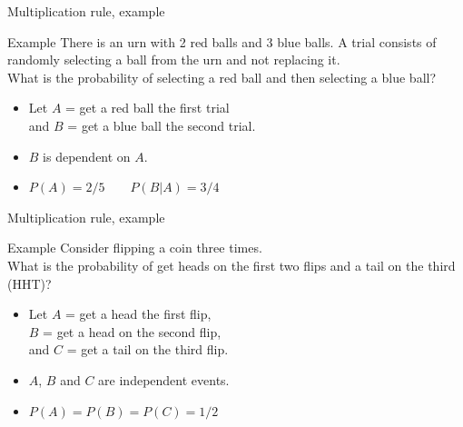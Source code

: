 \documentclass[xcolor=table, aspectratio=169, bigger]{beamer}
\begin{document}
\begin{frame}{Multiplication rule, example}
\begin{exampleblock}{Example}
There is an urn with 2 red balls and 3 blue balls. A trial consists of randomly selecting a ball from the urn and not replacing it.\\
\medskip 
What is the probability of selecting a red ball and then selecting a blue ball?
\begin{itemize}
\pause
\item Let $A$ = get a red ball the first trial\\
 and $B$ = get a blue ball the second trial.\\

\pause
\item $B$ is dependent on $A$.\\ \smallskip
{} \smallskip

\pause
\item $P(A) = 2/5 \qquad P(B|A) = 3/4$\\ \smallskip

\pause
{}

\end{itemize}

\end{exampleblock}
\end{frame}

\begin{frame}{Multiplication rule, example}
\begin{exampleblock}{Example}
Consider flipping a coin three times.\\
\medskip 
What is the probability of get heads on the first two flips and a tail on the third (HHT)?
\begin{itemize}
\pause
\item Let $A$ = get a head the first flip,\\
 $B$ = get a head on the second flip,\\
and $C$ = get a tail on the third flip.

\pause
\item $A$, $B$ and $C$ are independent events.\\ \smallskip
{} \smallskip

\pause
\item $P(A) = P(B) = P(C) = 1/2$\\ \smallskip

\pause
{}

\end{itemize}

\end{exampleblock}
\end{frame}
\end{document}
